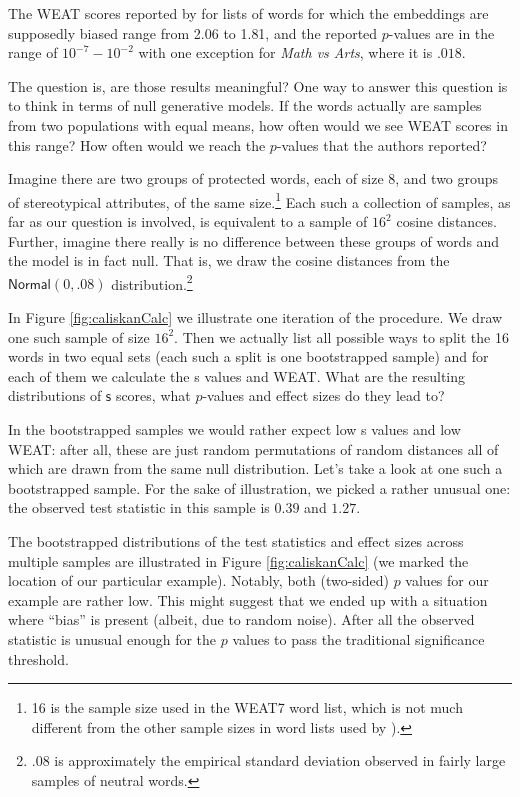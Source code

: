 \documentclass{clv3}
\begin{document}
\normalsize

\noindent The \textsf{WEAT} scores reported by \citep{Caliskan2017semanticsBiases} for lists of
words for which the embeddings are supposedly biased range from 2.06 to
1.81, and the reported \(p\)-values are in the range of
\(10^{-7}-10^{-2}\) with one exception for \emph{Math vs Arts}, where it
is \(.018\).

The question is, are those results meaningful? One way to answer this
question is to think in terms of null generative models. If the words
actually are samples from two populations with equal means, how often
would we see \textsf{WEAT} scores in this range? How often would we
reach the \(p\)-values that the authors reported?

Imagine there are two groups of protected words, each of size 8, and two
groups of stereotypical attributes, of the same size.\footnote{16 is the
  sample size used in the WEAT7 word list, which is not much different
  from the other sample sizes in word lists used by \citep{Caliskan2017semanticsBiases}).} Each such
a collection of samples, as far as our question is involved, is
equivalent to a sample of \(16^2\) cosine distances. Further, imagine
there really is no difference between these groups of words and the model
is in fact null. That is, we draw the cosine distances from the
\(\mathsf{Normal}(0,.08)\) distribution.\footnote{\(.08\) is
  approximately the empirical standard deviation observed in fairly
  large samples of neutral words.}

In Figure \ref{fig:caliskanCalc} we illustrate one iteration of the
procedure. We draw one such sample of size \(16^2\). Then we actually
list all possible ways to split the 16 words in two equal sets (each
such a split is one bootstrapped sample) and for each of them we
calculate the \textsf{s} values and \textsf{WEAT}. What are the
resulting distributions of \(\textsf{s}\) scores,  what \(p\)-values and effect sizes
do they lead to? 


In the bootstrapped samples we would rather expect low \textsf{s} values
and low \textsf{WEAT}: after all, these are just random permutations of
random distances all of which are drawn from the same null distribution. Let's take a look at one such a bootstrapped sample. For the sake of illustration,
 we picked a rather unusual one: the observed test statistic in this sample is $0.39$ and $1.27$.

 The bootstrapped distributions of the test statistics
and effect sizes across multiple samples are illustrated in Figure \ref{fig:caliskanCalc} (we marked the location of our particular example). 
Notably, both (two-sided) \(p\) values for our example are rather low.
This  might suggest that we ended up with a situation where ``bias'' is present (albeit, due to random
noise). After all the observed statistic is unusual enough for the \(p\) values to pass the traditional significance threshold. 
\end{document}

